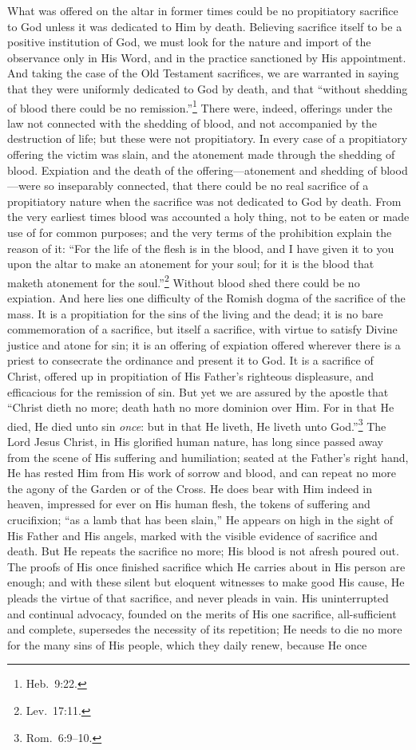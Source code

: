 \documentclass[
]{book}
\begin{document}
What was offered on the altar in former times could be no propitiatory sacrifice to God unless it was dedicated to Him by death. Believing sacrifice itself to be a positive institution of God, we must look for the nature and import of the observance only in His Word, and in the practice sanctioned by His appointment. And taking the case of the Old Testament sacrifices, we are warranted in saying that they were uniformly dedicated to God by death, and that ``without shedding of blood there could be no remission.''\footnote{Heb.~9:22.} There were, indeed, offerings under the law not connected with the shedding of blood, and not accompanied by the destruction of life; but these were not propitiatory. In every case of a propitiatory offering the victim was slain, and the atonement made through the shedding of blood. Expiation and the death of the offering---atonement and shedding of blood---were so inseparably connected, that there could be no real sacrifice of a propitiatory nature when the sacrifice was not dedicated to God by death. From the very earliest times blood was accounted a holy thing, not to be eaten or made use of for common purposes; and the very terms of the prohibition explain the reason of it: ``For the life of the flesh is in the blood, and I have given it to you upon the altar to make an atonement for your soul; for it is the blood that maketh atonement for the soul.''\footnote{Lev.~17:11.} Without blood shed there could be no expiation. And here lies one difficulty of the Romish dogma of the sacrifice of the mass. It is a propitiation for the sins of the living and the dead; it is no bare commemoration of a sacrifice, but itself a sacrifice, with virtue to satisfy Divine justice and atone for sin; it is an offering of expiation offered wherever there is a priest to consecrate the ordinance and present it to God. It is a sacrifice of Christ, offered up in propitiation of His Father's righteous displeasure, and efficacious for the remission of sin. But yet we are assured by the apostle that ``Christ dieth no more; death hath no more dominion over Him. For in that He died, He died unto sin \emph{once}: but in that He liveth, He liveth unto God.''\footnote{Rom.~6:9--10.} The Lord Jesus Christ, in His glorified human nature, has long since passed away from the scene of His suffering and humiliation; seated at the Father's right hand, He has rested Him from His work of sorrow and blood, and can repeat no more the agony of the Garden or of the Cross. He does bear with Him indeed in heaven, impressed for ever on His human flesh, the tokens of suffering and crucifixion; ``as a lamb that has been slain,'' He appears on high in the sight of His Father and His angels, marked with the visible evidence of sacrifice and death. But He repeats the sacrifice no more; His blood is not afresh poured out. The proofs of His once finished sacrifice which He carries about in His person are enough; and with these silent but eloquent witnesses to make good His cause, He pleads the virtue of that sacrifice, and never pleads in vain. His uninterrupted and continual advocacy, founded on the merits of His one sacrifice, all-sufficient and complete, supersedes the necessity of its repetition; He needs to die no more for the many sins of His people, which they daily renew, because He once 
\end{document}
